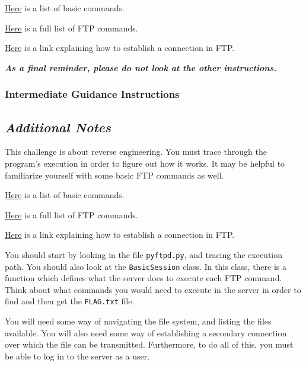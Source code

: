 {{{                    \href{https://kb.iu.edu/d/aenq}{Here} is a list of basic commands.

                    \href{https://en.wikipedia.org/wiki/List_of_FTP_commands}{Here} is a full list of FTP commands.

                    \href{https://www.serv-u.com/resource/tutorial/pasv-response-epsv-port-pbsz-rein-ftp-command#fac52a38-7ddb-4815-a9dc-72cc03c0a8e6}{Here} is a link explaining how to establish a connection in FTP.

                    \textbf{\textit{As a final reminder, please do not look at the other instructions.}}
            }
        \newpage
        \subsubsection{Intermediate Guidance Instructions}
            {\parindent0pt\singlespacing
                \subsection*{\textit{Additional Notes}}
                    This challenge is about reverse engineering. %
You must trace through the program's execution in order to figure out how it works. %
It may be helpful to familiarize yourself with some basic FTP commands as well. 

                    \href{https://kb.iu.edu/d/aenq}{Here} is a list of basic commands.

                    \href{https://en.wikipedia.org/wiki/List_of_FTP_commands}{Here} is a full list of FTP commands.

                    \href{https://www.serv-u.com/resource/tutorial/pasv-response-epsv-port-pbsz-rein-ftp-command#fac52a38-7ddb-4815-a9dc-72cc03c0a8e6}{Here} is a link explaining how to establish a connection in FTP.

                    You should start by looking in the file \lstinline`pyftpd.py`, and tracing the execution path. %
You should also look at the \lstinline`BasicSession` class. %
In this class, there is a function which defines what the server does to execute each FTP command. %
Think about what commands you would need to execute in the server in order to find and then get the \lstinline`FLAG.txt` file. 

                    You will need some way of navigating the file system, and listing the files available. %
You will also need some way of establishing a secondary connection over which the file can be transmitted. %
Furthermore, to do all of this, you must be able to log in to the server as a user. 

}}}
